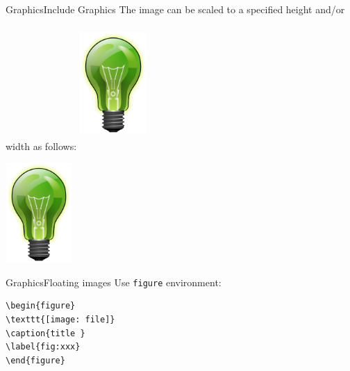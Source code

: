 \documentclass{bredelebeamer}
\begin{document}
\begin{frame}[fragile]{Graphics}{Include Graphics}
The image can be scaled to a specified height and/or width as follows:
\texttt{\includegraphics[height=2in,width=1in]{images/bulb}}
\begin{center}
\includegraphics[height=1.5in,width=1in]{images/bulb}
\end{center}
\end{frame}

\begin{frame}[fragile]{Graphics}{Floating images}
Use \texttt{figure} environment:
\begin{center}
\begin{verbatim}
\begin{figure}
\texttt{[image: file]}
\caption{title }
\label{fig:xxx}
\end{figure}
\end{verbatim}
\end{center}
\end{frame}
\end{document}

